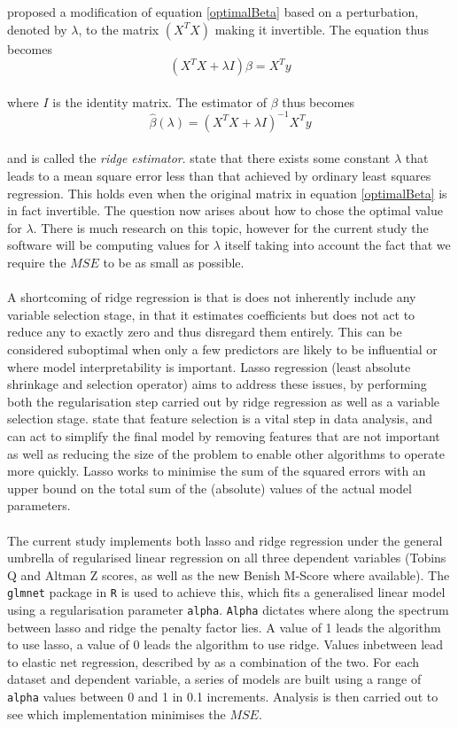 {{\cite{hoerlRidge} proposed a modification of equation \ref{optimalBeta} based on a perturbation, denoted by $\lambda$, to the matrix $(X^T X)$ making it invertible. The equation thus becomes
\begin {equation}\label{optimalBetaPurt}
(X^T X + \lambda I )\beta = X^T y
\end{equation}\\
where $I$ is the identity matrix. The estimator of $\beta$ thus becomes
\begin {equation}\label{ridgeEstimator}
\hat{\beta} (\lambda) =  (X^T X + \lambda I)^{- 1}X^T y
\end{equation}\\
and is called the {\it ridge estimator}. \cite{hoerlRidge} state that there exists some constant $\lambda$ that leads to a mean square error less than that achieved by ordinary least squares regression. This holds even when the original matrix in equation \ref{optimalBeta} is in fact invertible. The question now arises about how to chose the optimal value for $\lambda$. There is much research on this topic, however for the current study the software will be computing values for $\lambda$ itself taking into account the fact that we require the $MSE$ to be as small as possible.   \\\\
A shortcoming of ridge regression is that is does not inherently include any variable selection stage, in that it estimates coefficients but does not act to reduce any to exactly zero and thus disregard them entirely. This can be considered suboptimal when only a few predictors are likely to be influential or where model interpretability is important. Lasso regression (least absolute shrinkage and selection operator) aims to address these issues, by performing both the regularisation step carried out by ridge regression as well as a variable selection stage. \cite{fonti2017feature} state that feature selection is a vital step in data analysis, and can act to simplify the final model by removing features that are not important as well as reducing the size of the problem to enable other algorithms to operate more quickly. Lasso works to minimise the sum of the squared errors with an upper bound on the total sum of the (absolute) values of the actual model parameters.   \\\\
The current study implements both lasso and ridge regression under the general umbrella of regularised linear regression on all three dependent variables (Tobins Q and Altman Z scores, as well as the new Benish M-Score where available). The \texttt{glmnet} package in \texttt{R} is used to achieve this, which fits a generalised linear model using a regularisation parameter \texttt{alpha}. \texttt{Alpha} dictates where along the spectrum between lasso and ridge the penalty factor lies. A value of 1 leads the algorithm to use lasso, a value of 0 leads the algorithm to use ridge. Values inbetween lead to elastic net regression, described by \cite{fonti2017feature} as a combination of the two. For each dataset and dependent variable, a series of models are built using a range of \texttt{alpha} values between 0 and 1 in 0.1 increments. Analysis is then carried out to see which implementation minimises the $MSE$. }
}
